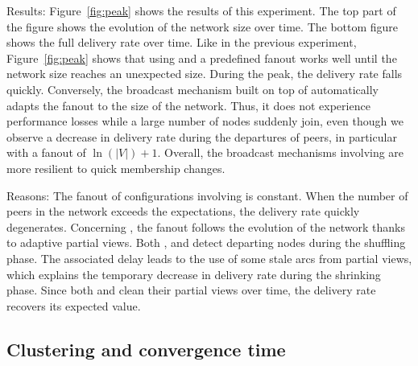 \begin{asparadesc}
\item [Results:] Figure~\ref{fig:peak} shows the results of this
  experiment. The top part of the figure shows the evolution of the
  network size over time. The bottom figure shows the full delivery
  rate over time. Like in the previous experiment,
  Figure~\ref{fig:peak} shows that using \CYCLON and a predefined
  fanout works well until the network size reaches an unexpected
  size. During the peak, the delivery rate falls quickly. Conversely,
  the broadcast mechanism built on top of \SPRAY automatically adapts
  the fanout to the size of the network. Thus, it does not experience
  performance losses while a large number of nodes suddenly join, even
  though we observe a decrease in delivery rate during the departures
  of peers, in particular with a fanout of $\ln(|V|)+1$. Overall, the
  broadcast mechanisms involving \SPRAY are more resilient to quick
  membership changes.
\item [Reasons:] The fanout of configurations involving \CYCLON is
  constant. When the number of peers in the network exceeds the
  expectations, the delivery rate quickly degenerates. Concerning
  \SPRAY, the fanout follows the evolution of the network thanks to
  adaptive partial views. Both \SPRAY, and \CYCLON detect departing
  nodes during the shuffling phase. The associated delay leads to the
  use of some stale arcs from partial views, which explains the
  temporary decrease in delivery rate during the shrinking
  phase. Since both \CYCLON and \SPRAY clean their partial views over
  time, the delivery rate recovers its expected value.
\end{asparadesc}




\subsection{Clustering and convergence time}

